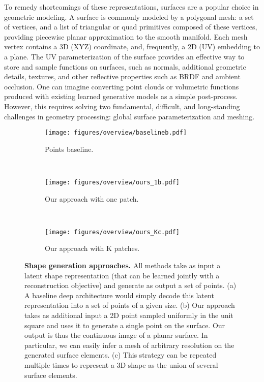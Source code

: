 \documentclass[10pt,twocolumn,letterpaper]{article}
\begin{document}
To remedy shortcomings of these representations, surfaces are a popular choice in geometric modeling. A surface is commonly modeled by a  polygonal mesh: a set of vertices, and a list of triangular or quad primitives composed of these vertices, providing piecewise planar approximation to the smooth manifold. Each mesh vertex contains a 3D (XYZ) coordinate, and, frequently, a 2D (UV) embedding to a plane. The UV parameterization of the surface provides an effective way to store and sample functions on surfaces, such as normals, additional geometric details, textures, and other reflective properties such as BRDF and ambient occlusion. 
One can imagine converting point clouds or volumetric functions produced with existing learned generative models as a simple post-process. However, this requires solving two fundamental, difficult, and long-standing challenges in geometry processing: global surface parameterization and meshing. 





\begin{figure*}[t!]
\centering
\begin{subfigure}[b]{0.32\linewidth}
 \texttt{[image: figures/overview/baselineb.pdf]}
\caption{Points baseline. \label{fig:baseline}}
\end{subfigure}
~\vline~
\begin{subfigure}[b]{0.32\linewidth}
 \texttt{[image: figures/overview/ours\_1b.pdf]}
\caption{Our approach with one patch. \label{fig:ours1}}
\end{subfigure}
~\vline~
\begin{subfigure}[b]{0.32\linewidth}
 \texttt{[image: figures/overview/ours\_Kc.pdf]}
\caption{Our approach with K patches. \label{fig:oursK}}
\end{subfigure}
\caption{{\bf Shape generation approaches.} All methods take as input a latent shape representation (that can be learned jointly with a reconstruction objective) and generate as output a set of points. (a) A baseline deep architecture would simply decode this latent representation into a set of points of a given size. (b) Our approach takes as additional input a 2D point sampled uniformly in the unit square and uses it to generate a single point on the surface. Our output is thus the continuous image of a planar surface. In particular, we can easily infer a mesh of arbitrary resolution on the generated surface elements. (c) This strategy can be repeated multiple times to represent a 3D shape as the union of several surface elements.
}
  \label{fig:overview}
  \vspace*{-4mm}
\end{figure*}
\end{document}
